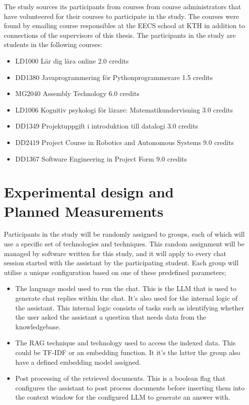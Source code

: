 The study sources its participants from courses from course administrators that have volunteered for their courses to participate in the study. The courses were found by emailing course responsibles at the EECS school at KTH in addition to connections of the supervisors of this thesis. The participants in the study are students in the following courses:


\begin{itemize}
        \item LD1000 Lär dig lära online 2.0 credits
        \item DD1380 Javaprogrammering för Pythonprogrammerare 1.5 credits
        \item MG2040 Assembly Technology 6.0 credits
        \item LD1006 Kognitiv psykologi för lärare: Matematikundervisning 3.0 credits
        \item DD1349 Projektuppgift i introduktion till datalogi 3.0 credits
        \item DD2419 Project Course in Robotics and Autonomous Systems 9.0 credits
        \item DD1367 Software Engineering in Project Form 9.0 credits
\end{itemize}


\section[Experimental design/Planned Measurements]{Experimental design and\\Planned Measurements}
\label{sec:experimentalDesign}


Participants in the study will be randomly assigned to groups, each of which will use a specific set of technologies and techniques. This random assignment will be managed by software written for this study, and it will apply to every chat session started with the assistant by the participating student. Each group will utilise a unique configuration based on one of these predefined parameters;


\begin{itemize}
        \item The language model used to run the chat. This is the \gls{LLM} that is used to generate chat replies within the chat. It’s also used for the internal logic of the assistant. This internal logic consists of tasks such as identifying whether the user asked the assistant a question that needs data from the knowledgebase.
        \item The \gls{RAG} technique and technology used to access the indexed data. This could be \gls{TF-IDF} or an embedding function. It it’s the latter the group also have a defined embedding model assigned.
        \item Post processing of the retrieved documents. This is a boolean flag that configures the assistant to post process documents before inserting them into the context window for the configured \gls{LLM} to generate an answer with.
\end{itemize}


